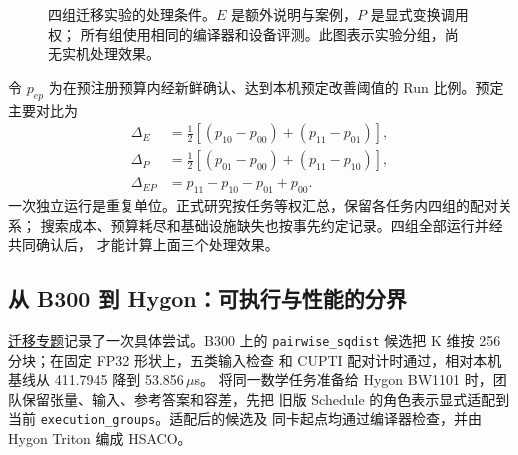 \documentclass[UTF8,11pt,a4paper,fontset=none]{ctexart}
\newcommand{\code}[1]{\texttt{#1}}
\newcommand{\repo}[2]{\href{https://github.com/qhy991/open-cake-ir/blob/677eb444fec593294c470dcc5793262ae769fce2/#1}{#2}}
\begin{document}
\begin{figure}[htbp]
\centering
{}
\caption{四组迁移实验的处理条件。$E$ 是额外说明与案例，$P$ 是显式变换调用权；
所有组使用相同的编译器和设备评测。此图表示实验分组，尚无实机处理效果。}
\label{fig:ep-study}
\end{figure}

令 $p_{ep}$ 为在预注册预算内经新鲜确认、达到本机预定改善阈值的 Run 比例。预定主要对比为
\begin{align*}
\Delta_E&=\tfrac12[(p_{10}-p_{00})+(p_{11}-p_{01})],\\
\Delta_P&=\tfrac12[(p_{01}-p_{00})+(p_{11}-p_{10})],\\
\Delta_{EP}&=p_{11}-p_{10}-p_{01}+p_{00}.
\end{align*}
一次独立运行是重复单位。正式研究按任务等权汇总，保留各任务内四组的配对关系；
搜索成本、预算耗尽和基础设施缺失也按事先约定记录。四组全部运行并经共同确认后，
才能计算上面三个处理效果。

\subsection{从 B300 到 Hygon：可执行与性能的分界}
\repo{docs/OPTIMIZATION_TRANSFER.md}{迁移专题}记录了一次具体尝试。B300 上的
\code{pairwise\_sqdist} 候选把 K 维按 256 分块；在固定 FP32 形状上，五类输入检查
和 CUPTI 配对计时通过，相对本机基线从 411.7945 降到 53.856\,$\mu$s。
将同一数学任务准备给 Hygon BW1101 时，团队保留张量、输入、参考答案和容差，先把
旧版 Schedule 的角色表示显式适配到当前 \code{execution\_groups}。适配后的候选及
同卡起点均通过编译器检查，并由 Hygon Triton 编成 HSACO。
\end{document}
